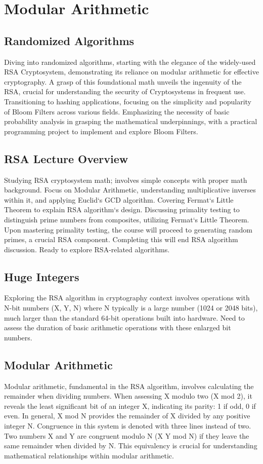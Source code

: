 \section*{Modular Arithmetic}

\subsection*{Randomized Algorithms}
Diving into randomized algorithms, starting with the elegance of the widely-used RSA Cryptosystem, demonstrating its reliance on modular arithmetic for effective cryptography.
A grasp of this foundational math unveils the ingenuity of the RSA, crucial for understanding the security of Cryptosystems in frequent use.
Transitioning to hashing applications, focusing on the simplicity and popularity of Bloom Filters across various fields.
Emphasizing the necessity of basic probability analysis in grasping the mathematical underpinnings, with a practical programming project to implement and explore Bloom Filters.

\subsection*{RSA  Lecture Overview}
Studying RSA cryptosystem math; involves simple concepts with proper math background.
Focus on Modular Arithmetic, understanding multiplicative inverses within it, and applying Euclid`s GCD algorithm.
Covering Fermat`s Little Theorem to explain RSA algorithm`s design.
Discussing primality testing to distinguish prime numbers from composites, utilizing Fermat`s Little Theorem.
Upon mastering primality testing, the course will proceed to generating random primes, a crucial RSA component.
Completing this will end RSA algorithm discussion.
Ready to explore RSA-related algorithms.

\subsection*{Huge Integers}
Exploring the RSA algorithm in cryptography context involves operations with N-bit numbers (X, Y, N) where N typically is a large number (1024 or 2048 bits), much larger than the standard 64-bit operations built into hardware.
Need to assess the duration of basic arithmetic operations with these enlarged bit numbers.

\subsection*{Modular Arithmetic}
Modular arithmetic, fundamental in the RSA algorithm, involves calculating the remainder when dividing numbers.
When assessing X modulo two (X mod 2), it reveals the least significant bit of an integer X, indicating its parity: 1 if odd, 0 if even.
In general, X mod N provides the remainder of X divided by any positive integer N\@.
Congruence in this system is denoted with three lines instead of two.
Two numbers X and Y are congruent modulo N (X  Y mod N) if they leave the same remainder when divided by N\@.
This equivalency is crucial for understanding mathematical relationships within modular arithmetic.

